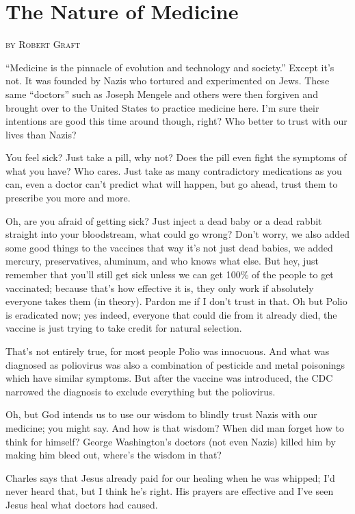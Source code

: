 \section{The Nature of Medicine}
\begin{flushright}
\textsc{
by Robert Graft}
\end{flushright}

``Medicine is the pinnacle of evolution and technology and society.'' Except it's not. It was founded by Nazis who tortured and experimented on Jews. These same ``doctors'' such as Joseph Mengele and others were then forgiven and brought over to the United States to practice medicine here. I'm sure their intentions are good this time around though, right? Who better to trust with our lives than Nazis?

You feel sick? Just take a pill, why not? Does the pill even fight the symptoms of what you have? Who cares. Just take as many contradictory medications as you can, even a doctor can't predict what will happen, but go ahead, trust them to prescribe you more and more.

Oh, are you afraid of getting sick? Just inject a dead baby or a dead rabbit straight into your bloodstream, what could go wrong? Don't worry, we also added some good things to the vaccines that way it's not just dead babies, we added mercury, preservatives, aluminum, and who knows what else. But hey, just remember that you'll still get sick unless we can get 100\% of the people to get vaccinated; because that's how effective it is, they only work if absolutely everyone takes them (in theory). Pardon me if I don't trust in that. Oh but Polio is eradicated now; yes indeed, everyone that could die from it already died, the vaccine is just trying to take credit for natural selection.

That's not entirely true, for most people Polio was innocuous. And what was diagnosed as poliovirus was also a combination of pesticide and metal poisonings which have similar symptoms. But after the vaccine was introduced, the CDC narrowed the diagnosis to exclude everything but the poliovirus.

Oh, but God intends us to use our wisdom to blindly trust Nazis with our medicine; you might say. And how is that wisdom? When did man forget how to think for himself? George Washington's doctors (not even Nazis) killed him by making him bleed out, where's the wisdom in that?

Charles says that Jesus already paid for our healing when he was whipped; I'd never heard that, but I think he's right. His prayers are effective and I've seen Jesus heal what doctors had caused.

